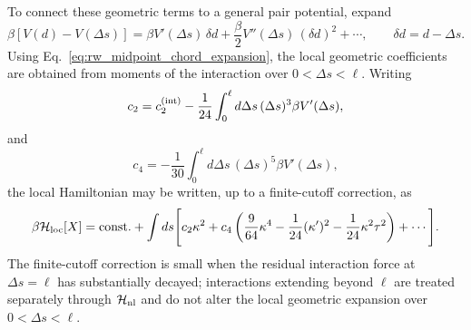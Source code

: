 \documentclass[11pt]{article}
\begin{document}
To connect these geometric terms to a general pair potential, expand
\begin{equation}
\beta\left[V(d)-V(\Delta s)\right]
=
\beta V'(\Delta s)\,\delta d
+
\frac{\beta}{2}V''(\Delta s)\,(\delta d)^2
+\cdots,
\qquad
\delta d=d-\Delta s.
\end{equation}
Using Eq.~\eqref{eq:rw_midpoint_chord_expansion}, the local geometric coefficients are obtained from moments of the interaction over \(0<\Delta s<\ell\). Writing
\begin{equation}
c_2
=
c_2^{(\rm int)}
-
\frac{1}{24}
\int_0^\ell d\Delta s\,(\Delta s)^3\beta V'(\Delta s),
\label{eq:c2_general}
\end{equation}
and
\begin{equation}
c_4
=
-\frac{1}{30}
\int_0^\ell d\Delta s\,(\Delta s)^5\beta V'(\Delta s),
\label{eq:c4_general}
\end{equation}
the local Hamiltonian may be written, up to a finite-cutoff correction, as
\begin{equation}
\beta\mathcal H_{\rm loc}[X]
=
\mathrm{const.}
+
\int ds\Bigg[
c_2\kappa^2
+
c_4\left(
\frac{9}{64}\kappa^4
-\frac{1}{24}(\kappa')^2
-\frac{1}{24}\kappa^2\tau^2
\right)
+\cdots
\Bigg].
\label{eq:Hloc_linked}
\end{equation}
The finite-cutoff correction is small when the residual interaction force at \(\Delta s=\ell\) has substantially decayed; interactions extending beyond \(\ell\) are treated separately through \(\mathcal H_{\rm nl}\) and do not alter the local geometric expansion over \(0<\Delta s<\ell\).
\end{document}
